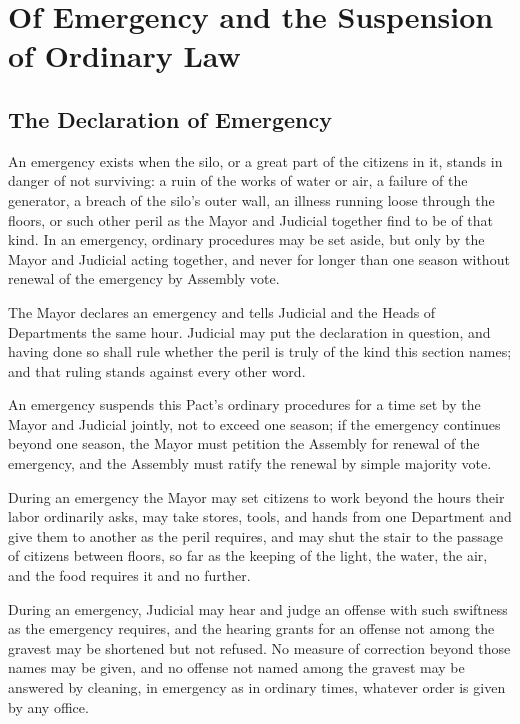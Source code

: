 \chapter{Of Emergency and the Suspension of Ordinary Law}
\label{art:emergency}


\section{The Declaration of Emergency}
\label{sec:emergency:declaration-of-emergency}

An emergency exists when the silo, or a great part of the citizens in it, stands in danger of not surviving: a ruin of the works of water or air, a failure of the generator, a breach of the silo's outer wall, an illness running loose through the floors, or such other peril as the Mayor and Judicial together find to be of that kind. In an emergency, ordinary procedures may be set aside, but only by the Mayor and Judicial acting together, and never for longer than one season without renewal of the emergency by Assembly vote.

\begin{clauses}
\item The Mayor declares an emergency and tells Judicial and the Heads of Departments the same hour. Judicial may put the declaration in question, and having done so shall rule whether the peril is truly of the kind this section names; and that ruling stands against every other word.
\item An emergency suspends this Pact's ordinary procedures for a time set by the Mayor and Judicial jointly, not to exceed one season; if the emergency continues beyond one season, the Mayor must petition the Assembly for renewal of the emergency, and the Assembly must ratify the renewal by simple majority vote.
\item During an emergency the Mayor may set citizens to work beyond the hours their labor ordinarily asks, may take stores, tools, and hands from one Department and give them to another as the peril requires, and may shut the stair to the passage of citizens between floors, so far as the keeping of the light, the water, the air, and the food requires it and no further.
\item During an emergency, Judicial may hear and judge an offense with such swiftness as the emergency requires, and the hearing  grants for an offense not among the gravest may be shortened but not refused. No measure of correction beyond those  names may be given, and no offense not named among the gravest may be answered by cleaning, in emergency as in ordinary times, whatever order is given by any office.
\end{clauses}

